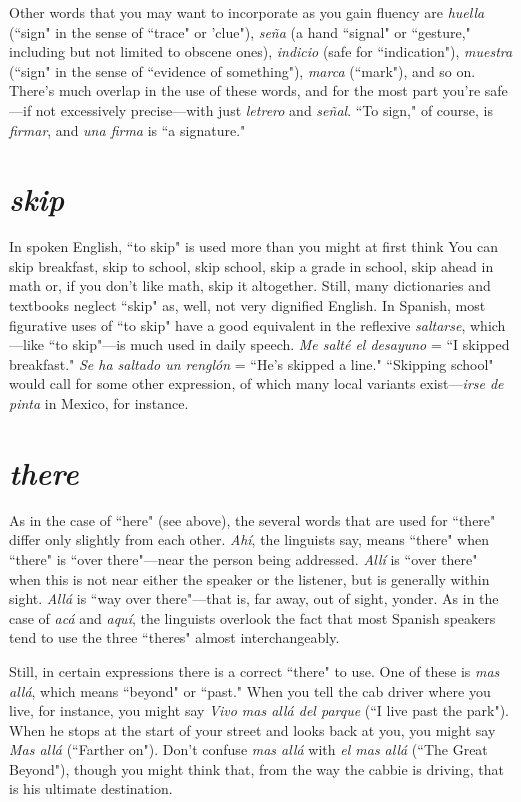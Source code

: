 Other words that you may want to incorporate as you gain fluency are \emph{huella} (``sign" in the sense of ``trace" or 'clue"), \emph{seña} (a hand
``signal" or ``gesture," including but not limited to obscene ones), \emph{indicio} (safe for ``indication"), \emph{muestra} (``sign" in the sense of ``evidence
of something"), \emph{marca} (``mark"), and so on. There's much overlap in
the use of these words, and for the most part you're safe---if not excessively precise---with just \emph{letrero} and \emph{señal}. ``To sign," of course, is \emph{firmar}, and \emph{una firma} is ``a signature."

\section{\emph{skip}}

In spoken English, ``to skip" is used more than you might at
first think You can skip breakfast, skip to school, skip school, skip a
grade in school, skip ahead in math or, if you don't like math, skip it
altogether. Still, many dictionaries and textbooks neglect ``skip" as,
well, not very dignified English. In Spanish, most figurative uses of
``to skip" have a good equivalent in the reflexive \emph{saltarse}, which---like
``to skip"---is much used in daily speech. \emph{Me salté el desayuno} = ``I
skipped breakfast." \emph{Se ha saltado un renglón} = ``He's skipped a line."
``Skipping school" would call for some other expression, of which
many local variants exist---\emph{irse de pinta} in Mexico, for instance.

\section{\emph{there}}

As in the case of ``here" (see above), the several words that are
used for ``there" differ only slightly from each other. \emph{Ahí}, the linguists
say, means ``there" when ``there" is ``over there"---near the person
being addressed. \emph{Allí} is ``over there" when this is not near either the
speaker or the listener, but is generally within sight. \emph{Allá} is ``way over
there"---that is, far away, out of sight, yonder. As in the case of \emph{acá} and
\emph{aquí}, the linguists overlook the fact that most Spanish speakers tend
to use the three ``theres" almost interchangeably.

Still, in certain expressions there is a correct ``there" to use.
One of these is \emph{mas allá}, which means ``beyond" or ``past." When you
tell the cab driver where you live, for instance, you might say \emph{Vivo
mas allá del parque} (``I live past the park"). When he stops at the start
of your street and looks back at you, you might say \emph{Mas allá} (``Farther
on"). Don't confuse \emph{mas allá} with \emph{el mas allá} (``The Great Beyond"),
though you might think that, from the way the cabbie is driving, that
is his ultimate destination.

